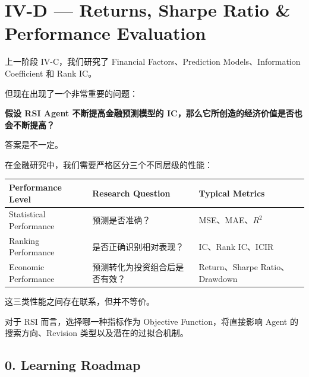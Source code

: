 \hypertarget{part-4-67-0001-iv-d-returns-sharpe-ratio-performance-evaluation}{%
\section{IV-D --- Returns, Sharpe Ratio \& Performance Evaluation}\label{part-4-67-0001-iv-d-returns-sharpe-ratio-performance-evaluation}}

上一阶段 IV-C，我们研究了 Financial Factors、Prediction Models、Information Coefficient 和 Rank IC。

但现在出现了一个非常重要的问题：

\textbf{假设 RSI Agent 不断提高金融预测模型的 IC，那么它所创造的经济价值是否也会不断提高？}

答案是不一定。

在金融研究中，我们需要严格区分三个不同层级的性能：

\begin{readertable}
\begin{longtable}[]{@{}
  >{\raggedright\arraybackslash}p{}
  >{\raggedright\arraybackslash}p{}
  >{\raggedright\arraybackslash}p{}@{}}
\toprule
Performance Level & Research Question & Typical Metrics \\
\midrule
\endhead
Statistical Performance & 预测是否准确？ & MSE、MAE、\(R^2\) \\
Ranking Performance & 是否正确识别相对表现？ & IC、Rank IC、ICIR \\
Economic Performance & 预测转化为投资组合后是否有效？ & Return、Sharpe Ratio、Drawdown \\
\bottomrule
\end{longtable}
\end{readertable}

这三类性能之间存在联系，但并不等价。

对于 RSI 而言，选择哪一种指标作为 Objective Function，将直接影响 Agent 的搜索方向、Revision 类型以及潜在的过拟合机制。

\hypertarget{part-4-67-0001-learning-roadmap}{%
\subsection{0. Learning Roadmap}\label{part-4-67-0001-learning-roadmap}}

